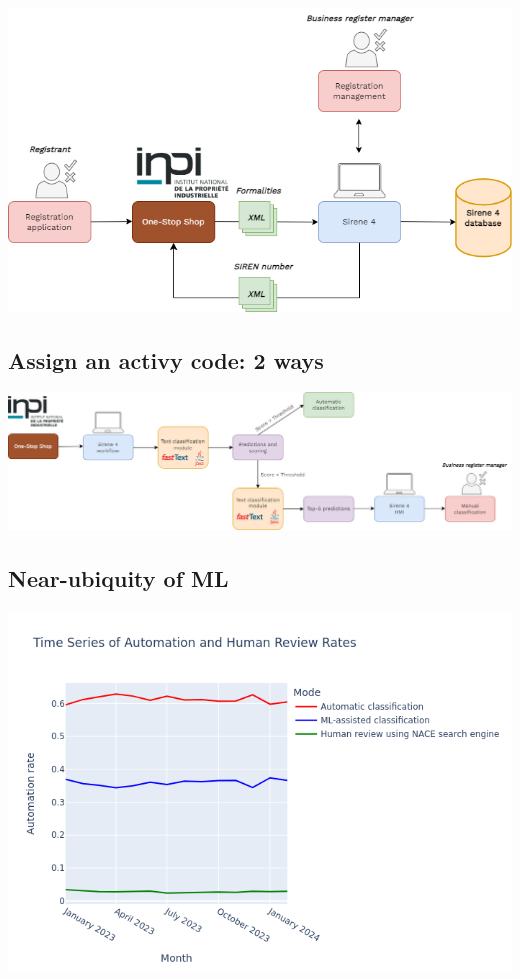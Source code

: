 \documentclass[
  letterpaper,
  DIV=11,
  numbers=noendperiod]{scrartcl}
\begin{document}
\begin{center}
\includegraphics{../img/flow-formalities.png}
\end{center}

\subsection{Assign an activy code: 2
ways}\label{assign-an-activy-code-2-ways}

\begin{center}
\includegraphics{../img/orga-post-prod-sirene4-en.png}
\end{center}

\subsection{Near-ubiquity of ML}\label{near-ubiquity-of-ml}

\begin{center}
\includegraphics{../img/automation_rate.png}
\end{center}
\end{document}
